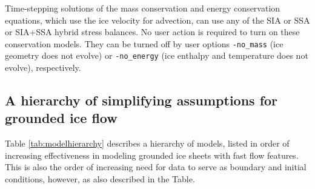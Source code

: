 Time-stepping solutions of the mass conservation and energy conservation equations, which use the ice velocity for advection, can use any of the SIA or SSA or SIA+SSA hybrid stress balances.  No user action is required to turn on these conservation models.  They can be turned off by user options \texttt{-no_mass} (ice geometry does not evolve) or \texttt{-no_energy} (ice enthalpy and temperature does not evolve), respectively.

\subsection{A hierarchy of simplifying assumptions for grounded ice flow}
\label{sec:model-hierarchy}
Table \ref{tab:modelhierarchy} describes a hierarchy of models, listed in order of increasing effectiveness in modeling grounded ice sheets with fast flow features.  This is also the order of increasing need for data to serve as boundary and initial conditions, however, as also described in the Table.

\newenvironment{tightlist}{\begin{itemize}  \vspace{-0.15in}\addtolength{\itemsep}{-0.5\baselineskip} } {\vspace{-0.1in} \end{itemize}}

\newcommand{\nolist}[1]{[\emph{#1}] \vspace{0.1in}}

